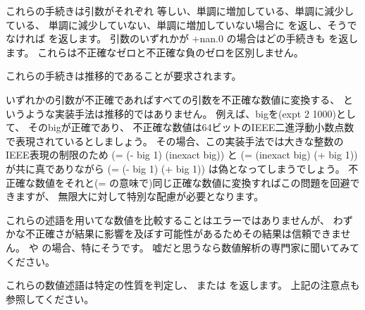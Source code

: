 \begin{entry}{%
}

これらの手続きは引数がそれぞれ
等しい、単調に増加している、単調に減少している、
単調に減少していない、単調に増加していない場合に %
\schtrue{}を返し、そうでなければ \schfalse{}を返します。
引数のいずれかが {\cf +nan.0} の場合はどの手続きも \schfalse{}を返します。
これらは不正確なゼロと不正確な負のゼロを区別しません。

これらの手続きは推移的であることが要求されます。

\begin{note}
いずれかの引数が不正確であればすべての引数を不正確な数値に変換する、
というような実装手法は推移的ではありません。
例えば、{\cf big}を{\cf (expt 2 1000)}として、
その{\cf big}が正確であり、
不正確な数値は64ビットのIEEE二進浮動小数点数で表現されているとしましょう。
その場合、この実装手法では大きな整数のIEEE表現の制限のため
{\cf (= (- big 1) (inexact big))} と {\cf (= (inexact big) (+ big 1))} が共に真でありながら
{\cf (= (- big 1) (+ big 1))} は偽となってしまうでしょう。
不正確な数値をそれと({\cf =} の意味で)同じ正確な数値に変換すればこの問題を回避できますが、
無限大に対して特別な配慮が必要となります。
\end{note}

\begin{note}
これらの述語を用いてな数値を比較することはエラーではありませんが、
わずかな不正確さが結果に影響を及ぼす可能性があるためその結果は信頼できません。
\ide{=}や の場合、特にそうです。
嘘だと思うなら数値解析の専門家に聞いてみてください。

\end{note}

\end{entry}

\begin{entry}{%
}

これらの数値述語は特定の性質を判定し、\schtrue{} または \schfalse を返します。
上記の注意点も参照してください。

\end{entry}

